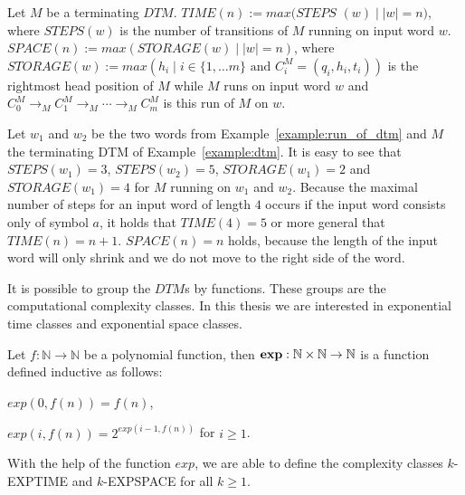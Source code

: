 \begin{definition}
    Let $M$ be a terminating $\mathit{DTM}$. $\mathit{TIME}(n):= max(\mathit{STEPS}$ $(w)\mid |w| = n)$, where
    $\mathit{STEPS}(w)$ is the number of transitions of $M$ running on input word $w$. $\mathit{SPACE}(n) := max
    (\mathit{STORAGE}(w)\mid |w| = n)$, where $\mathit{STORAGE}(w) := max(h_i\mid i\in\{1, \dots m\} \text{ and }
    C_i^M = (q_i, h_i, t_i))$ is the rightmost head position of $M$ while $M$ runs on input word $w$ and $C_0^M
    \rightarrow_M
    C_1^M \rightarrow_M \dotsb \rightarrow_M C_m^M$ is this run of $M$ on $w$.
\end{definition}

\begin{example}
    \label{example:time_and_space}
    Let $w_1$ and $w_2$ be the two words from Example~\ref{example:run_of_dtm} and $M$ the terminating DTM of Example~\ref{example:dtm}. It is easy to see that $\mathit{STEPS}
    (w_1) = 3$, $\mathit{STEPS}(w_2) = 5$, $\mathit{STORAGE}(w_1) = 2$ and $\mathit{STORAGE}(w_1) = 4$ for $M$ running on $w_1$ and $w_2$. Because the maximal number of steps for an input word of length $4$ occurs if the input word consists only of symbol
    $a$, it holds that $\mathit{TIME}(4) = 5$ or more general that $\mathit{TIME}(n) = n + 1$. $\mathit{SPACE}(n) = n$
    holds, because the length of the input word will only shrink and we do not move to the right side of the word.
\end{example}

It is possible to group the $\mathit{DTM}$s by functions. These groups are the computational complexity classes.
In this thesis we are interested in exponential time classes and exponential space classes.

\begin{definition}
    Let $f: \mathbb{N} \rightarrow \mathbb{N}$ be a polynomial function, then $\emph{exp}: \mathbb{N} \times \mathbb{N}
    \rightarrow \mathbb{N}$ is a function defined inductive as follows:
    \begin{compactitem}
        \item $exp(0, f(n)) = f(n)$,
        \item $exp(i, f(n)) = 2^{exp(i - 1, f(n))}$ for $i \geq 1$.
    \end{compactitem}
\end{definition}

With the help of the function $exp$, we are able to define the complexity classes $k$-EXPTIME and $k$-EXPSPACE for
all $k \geq 1$.

